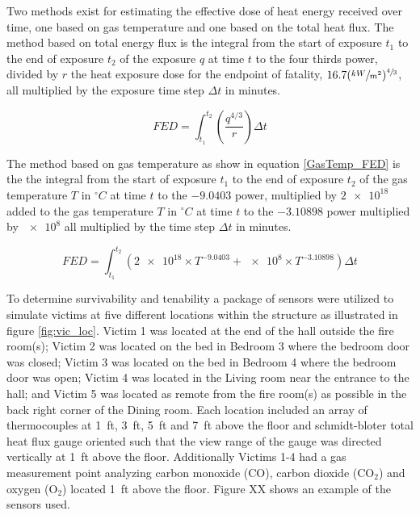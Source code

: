 \documentclass[12pt,oneside]{book}
\begin{document}
Two methods exist for estimating the effective dose of heat energy received over time, one based on gas temperature and one based on the total heat flux. The method based on total energy flux is the integral from the start of exposure $t_1$ to the end of exposure $t_2$ of the exposure $q$ at time $t$ to the four thirds power, divided by $r$ the heat exposure dose for the endpoint of fatality, $16.7(\sfrac{kW}{m^2})^{\sfrac{4}{3}}$, all multiplied by the exposure time step $\Delta t$ in minutes. \cite{SFPE:Purser}

\begin{equation} \label{TotalFlux_FED}
	FED = \int_{t_1}^{t_2} \left( \frac{q^{4/3}}{r} \right) \Delta t
\end{equation}

The method based on gas temperature as show in equation \ref{GasTemp_FED} is the the integral from the start of exposure $t_1$ to the end of exposure $t_2$ of the gas temperature $T$ in $^{\circ}C$ at time $t$ to the $-9.0403$ power, multiplied by $\num{2e18}$ added to the gas temperature $T$ in $^{\circ}C$ at time $t$ to the $-3.10898$ power multiplied by $\num{e8}$ all multiplied by the time step $\Delta t$ in minutes. \cite{SFPE:Purser}

\begin{equation} \label{GasTemp_FED}
	FED = \int_{t_1}^{t_2} \left( \num{2e18} \times T^{-9.0403} + \num{e8} \times T^{-3.10898} \right) \Delta t
\end{equation}

To determine survivability and tenability a package of sensors were utilized to simulate victims at five different locations within the structure as illustrated in figure \ref{fig:vic_loc}. Victim 1 was located at the end of the hall outside the fire room(s); Victim 2 was located on the bed in Bedroom 3 where the bedroom door was closed; Victim 3 was located on the bed in Bedroom 4 where the bedroom door was open; Victim 4 was located in the Living room near the entrance to the hall; and Victim 5 was located as remote from the fire room(s) as possible in the back right corner of the Dining room. Each location included an array of thermocouples at 1~ft, 3~ft, 5~ft and 7~ft above the floor and schmidt-bloter total heat flux gauge oriented such that the view range of the gauge was directed vertically at 1~ft above the floor. Additionally Victims 1-4 had a gas measurement point analyzing carbon monoxide (CO), carbon dioxide (CO$_{2}$) and oxygen (O$_{2}$) located 1~ft above the floor. Figure XX shows an example of the sensors used. 
\end{document}
